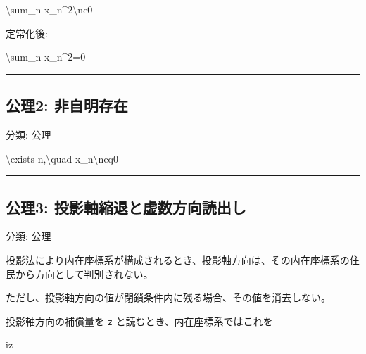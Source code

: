 \documentclass[
  a4paper,
]{ltjsarticle}
\newenvironment{Shaded}{}{}
\newcommand{\NormalTok}[1]{#1}
\begin{document}
\begin{Shaded}
\begin{Highlighting}[]
\NormalTok{\textbackslash{}sum\_n x\_n\^{}2\textbackslash{}ne0}
\end{Highlighting}
\end{Shaded}

定常化後:

\begin{Shaded}
\begin{Highlighting}[]
\NormalTok{\textbackslash{}sum\_n x\_n\^{}2=0}
\end{Highlighting}
\end{Shaded}

\begin{center}\rule{0.5\linewidth}{0.5pt}\end{center}

\subsection{公理2:
非自明存在}\label{ux516cux74062-ux975eux81eaux660eux5b58ux5728}

分類: 公理

\begin{Shaded}
\begin{Highlighting}[]
\NormalTok{\textbackslash{}exists n,\textbackslash{}quad x\_n\textbackslash{}neq0}
\end{Highlighting}
\end{Shaded}

\begin{center}\rule{0.5\linewidth}{0.5pt}\end{center}

\subsection{公理3:
投影軸縮退と虚数方向読出し}\label{ux516cux74063-ux6295ux5f71ux8ef8ux7e2eux9000ux3068ux865aux6570ux65b9ux5411ux8aadux51faux3057}

分類: 公理

投影法により内在座標系が構成されるとき、投影軸方向は、その内在座標系の住民から方向として判別されない。

ただし、投影軸方向の値が閉鎖条件内に残る場合、その値を消去しない。

投影軸方向の補償量を \texttt{z} と読むとき、内在座標系ではこれを

\begin{Shaded}
\begin{Highlighting}[]
\NormalTok{iz}
\end{Highlighting}
\end{Shaded}
\end{document}

